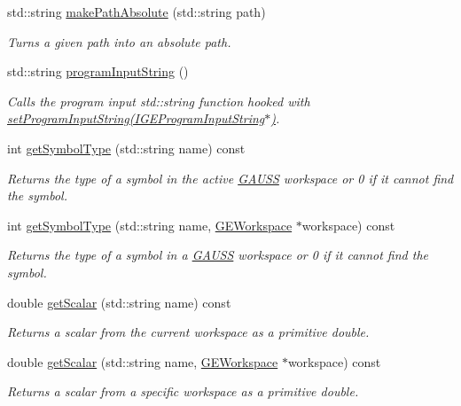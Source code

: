 \begin{DoxyCompactItemize}
std\-::string \hyperlink{class_g_a_u_s_s_a428f307c0d147730f80b0c3779ddbd32}{make\-Path\-Absolute} (std\-::string path)
\begin{DoxyCompactList}\small\item\em Turns a given path into an absolute path. \end{DoxyCompactList}\item 
std\-::string \hyperlink{class_g_a_u_s_s_afdcb5a64e926589539138da46dc92020}{program\-Input\-String} ()
\begin{DoxyCompactList}\small\item\em Calls the program input std\-::string function hooked with \hyperlink{class_g_a_u_s_s_ae82b5bfdf26971433c46936a812506c3}{set\-Program\-Input\-String(\-I\-G\-E\-Program\-Input\-String$\ast$)}. \end{DoxyCompactList}\item 
int \hyperlink{class_g_a_u_s_s_a5f5a511fea26f81c8140d057219b814e}{get\-Symbol\-Type} (std\-::string name) const 
\begin{DoxyCompactList}\small\item\em Returns the type of a symbol in the active \hyperlink{class_g_a_u_s_s}{G\-A\-U\-S\-S} workspace or 0 if it cannot find the symbol. \end{DoxyCompactList}\item 
int \hyperlink{class_g_a_u_s_s_a5fecdbce45aa8cb8e30fc87acbc372ec}{get\-Symbol\-Type} (std\-::string name, \hyperlink{class_g_e_workspace}{G\-E\-Workspace} $\ast$workspace) const 
\begin{DoxyCompactList}\small\item\em Returns the type of a symbol in a \hyperlink{class_g_a_u_s_s}{G\-A\-U\-S\-S} workspace or 0 if it cannot find the symbol. \end{DoxyCompactList}\item 
double \hyperlink{class_g_a_u_s_s_acda9f9521eae2e4dfda8ac038afa03c7}{get\-Scalar} (std\-::string name) const 
\begin{DoxyCompactList}\small\item\em Returns a scalar from the current workspace as a primitive {\ttfamily double}. \end{DoxyCompactList}\item 
double \hyperlink{class_g_a_u_s_s_a77b1f10ad64cacabf35622cca906580e}{get\-Scalar} (std\-::string name, \hyperlink{class_g_e_workspace}{G\-E\-Workspace} $\ast$workspace) const 
\begin{DoxyCompactList}\small\item\em Returns a scalar from a specific workspace as a primitive {\ttfamily double}. \end{DoxyCompactList}\item 

\end{DoxyCompactItemize}
